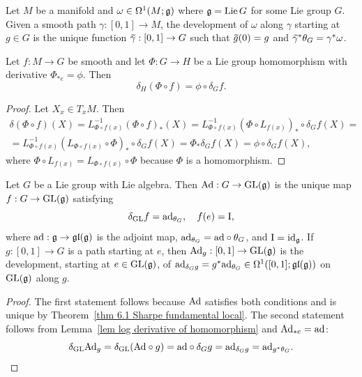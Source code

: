 \begin{defn}
    Let $M$ be a manifold and $\omega\in\Omega^1(M;\mathfrak{g})$ where $\mathfrak{g}=\operatorname{Lie} G$ for some Lie group $G$. Given a smooth path $\gamma:[0,1]\to M$, the development of $\omega$ along $\gamma$ starting at $g\in G$ is the unique function $\wt{\gamma}:[0,1]\to G$ such that $\wt{g}(0)=g$ and $\wt{\gamma}^\ast\theta_G=\gamma^\ast\omega$.
\end{defn}

\begin{lem}\label{lem log derivative of homomorphism}
    Let $f:M\to G$ be smooth and let $\Phi:G\to H$ be a Lie group homomorphism with derivative $\Phi_{\ast e}=\phi$. Then 
    \[\delta_H (\Phi\circ f)=\phi\circ\delta_G f.\]
\end{lem}
\begin{proof}
    Let $X_x\in T_x M$. Then
    \begin{multline}
        \delta(\Phi\circ f)(X)=L_{\Phi\circ f(x)}^{-1}(\Phi\circ f)_\ast(X)=L_{\Phi\circ f(x)}^{-1}(\Phi\circ  L_{f(x)})_\ast\circ  \delta_G f(X)=\\
        =L_{\Phi\circ f(x)}^{-1}(L_{\Phi\circ f(x)}\circ \Phi)_\ast\circ  \delta_G f(X)=\Phi_\ast\delta_G f(X)=\phi\circ \delta_G f(X),
    \end{multline}
    where $\Phi\circ L_{f(x)}=L_{\Phi\circ f(x)}\circ \Phi$ because $\Phi$ is a homomorphism.
\end{proof}

\begin{cor}\label{cor 5.3 Sharpe}
    Let $G$ be a Lie group with Lie algebra. Then $\mathrm{Ad}:G\to \operatorname{GL}(\mathfrak{g})$ is the unique map $f:G\to \operatorname{GL}(\mathfrak{g})$ satisfying  
    \[\delta_{\operatorname{GL}} f=\mathrm{ad}_{\theta_G},\quad f(e)=\mathrm{I},\]
    where $\mathrm{ad}:\mathfrak{g}\to \mathfrak{gl}(\mathfrak{g})$ is the adjoint map, $\mathrm{ad}_{\theta_G}=\mathrm{ad}\circ\theta_G$, and $\mathrm{I}=\operatorname{id}_{\mathfrak{g}}$. 
    If $g:[0,1]\to G$ is a path starting at $e$, then $\mathrm{Ad}_g:[0,1]\to \operatorname{GL}(\mathfrak{g})$ is the development, starting at $e\in\operatorname{GL}(\mathfrak{g})$, of $\mathrm{ad}_{\delta_G g}=g^\ast \mathrm{ad}_{\theta_G}\in\Omega^1([0,1];\mathfrak{gl}(\mathfrak{g}))$ on $\operatorname{GL}(\mathfrak{g})$ along $g$.
\end{cor}
\begin{proof}
    The first statement follows because $\mathrm{Ad}$ satisfies both conditions and is unique by Theorem~\ref{thm 6.1 Sharpe fundamental local}. 
    The second statement follows from Lemma~\ref{lem log derivative of homomorphism} and $\mathrm{Ad}_{\ast e}=\mathrm{ad}$:
    \[\delta_{\operatorname{GL}}\mathrm{Ad}_g=\delta_{\operatorname{GL}}(\mathrm{Ad}\circ g)=\mathrm{ad}\circ \delta_G g=\mathrm{ad}_{\delta_G g}=\mathrm{ad}_{g^\ast\theta_G}.\]
\end{proof}

